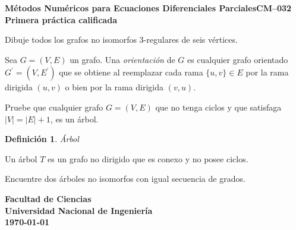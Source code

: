 \documentclass[spanish,addpoints,answers,a4paper,8pt]{exam}
\theoremstyle{definition}
\newtheorem{definition}{Definición}
\newcommand{\unmarkedfntext}[1]{%
	\begingroup
	\renewcommand\thefootnote{}\footnote{#1}%
	\addtocounter{footnote}{-1}%
	\endgroup
}
\begin{document}
\begin{center}
    \sffamily\bfseries\Large
    Métodos Numéricos para Ecuaciones Diferenciales Parciales\quad CM--032\\
    Primera práctica calificada
\end{center}

\begin{center}
\end{center}
\vspace{0.1in}
\vspace{0.2in}

\begin{questions}
    \question[5] Dibuje todos los grafos no isomorfos $3$-regulares de seis vértices.

    \question Sea $G=(V,E)$ un grafo. Una \emph{orientación} de $G$ es cualquier grafo orientado $G^{\prime}=(V,E^{\prime})$ que se obtiene al reemplazar cada rama $\{u,v\}\in E$ por la rama dirigida $(u,v)$ o bien por la rama dirigida $(v,u)$.

    \question[5] Pruebe que cualquier grafo $G=(V,E)$ que no tenga ciclos y que satisfaga $|V|=|E|+1$, es un árbol.

    \begin{definition}{\em Árbol}

        Un árbol $T$ es un grafo no dirigido que es conexo y no posee ciclos.
    \end{definition}

    \question[5] Encuentre dos árboles no isomorfos con igual secuencia de grados.
\end{questions}
\vfill
\begin{flushright}\bfseries
    Facultad de Ciencias\\[2mm]
    Universidad Nacional de Ingeniería\\[2mm]
    \today%
\end{flushright}
\end{document}
